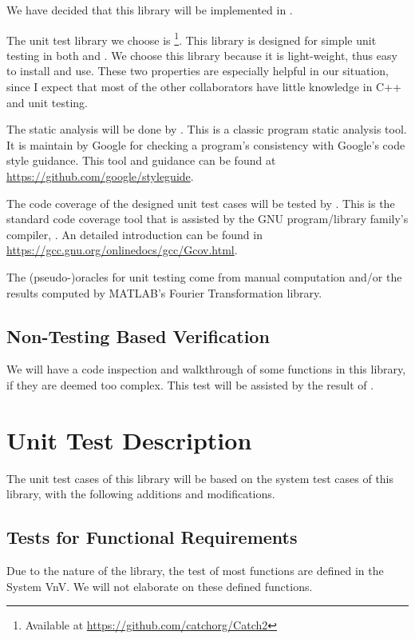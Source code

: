 \documentclass[12pt, titlepage]{article}
\begin{document}
We have decided that this library will be implemented in .

The unit test library we choose is \footnote{Available at \url{https://github.com/catchorg/Catch2}}. This library is designed for simple unit testing in both  and . We choose this library because it is light-weight, thus easy to install and use. These two properties are especially helpful in our situation, since I expect that most of the other collaborators have little knowledge in C++ and unit testing.

The static analysis will be done by . This is a classic  program static analysis tool. It is maintain by Google for checking a  program's consistency with Google's  code style guidance. This tool and guidance can be found at \url{https://github.com/google/styleguide}.

The code coverage of the designed unit test cases will be tested by . This is the standard code coverage tool that is assisted by the GNU program/library family's  compiler, . An detailed introduction can be found in \url{https://gcc.gnu.org/onlinedocs/gcc/Gcov.html}.

The (pseudo-)oracles for unit testing come from manual computation and/or the results computed by MATLAB's Fourier Transformation library.

\subsection{Non-Testing Based Verification}

We will have a code inspection and walkthrough of some functions in this library, if they are deemed too complex. This test will be assisted by the result of . 

\section{Unit Test Description}

The unit test cases of this library will be based on the system test cases of this library, with the following additions and modifications.
\subsection{Tests for Functional Requirements}
Due to the nature of the library, the test of most functions are defined in the System VnV. We will not elaborate on these defined functions.
\end{document}
